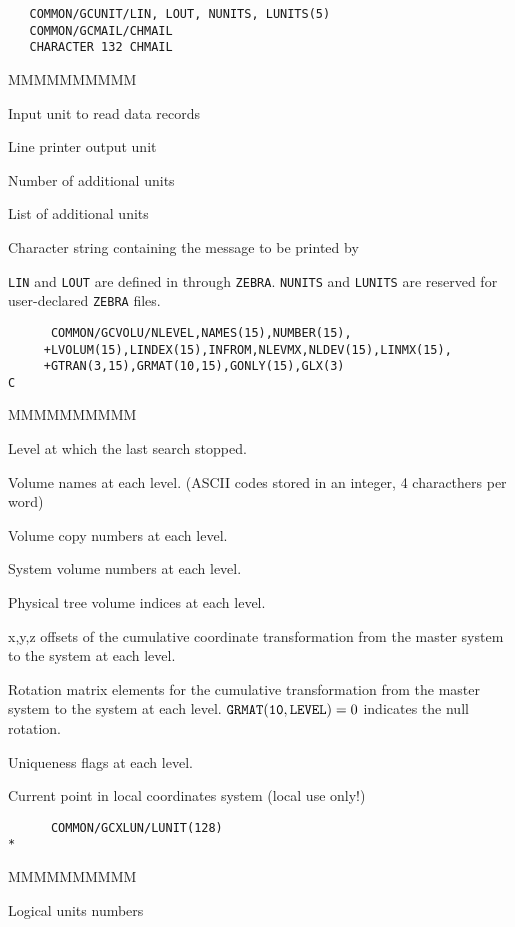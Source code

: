 \begin{verbatim}
   COMMON/GCUNIT/LIN, LOUT, NUNITS, LUNITS(5)
   COMMON/GCMAIL/CHMAIL
   CHARACTER 132 CHMAIL
\end{verbatim}
\begin{DLtt}{MMMMMMMMMM}
\item[LIN]Input unit to read data records
\item[LOUT]Line printer output unit
\item[NUNITS]Number of additional units
\item[LUNITS]List of additional units
\item[CHMAIL]Character string containing the message to be printed by
\end{DLtt}
 
{\tt LIN} and {\tt LOUT} are defined in  through {\tt ZEBRA}.
{\tt NUNITS} and {\tt LUNITS} are reserved
for user-declared {\tt ZEBRA} files.
\begin{verbatim}
      COMMON/GCVOLU/NLEVEL,NAMES(15),NUMBER(15),
     +LVOLUM(15),LINDEX(15),INFROM,NLEVMX,NLDEV(15),LINMX(15),
     +GTRAN(3,15),GRMAT(10,15),GONLY(15),GLX(3)
C
\end{verbatim}
\begin{DLtt}{MMMMMMMMMM}
\item[NLEVEL] Level at which the last search stopped.
\item[NAMES]Volume names at each level.
(ASCII codes stored in an integer, 4 characthers per word)
\item[NUMBER]Volume copy numbers at each level.
\item[LVOLUM]System volume numbers at each level.
\item[LINDEX]Physical tree volume indices at each level.
\item[INFROM]
\item[NLEVMX]
\item[NLDEV]
\item[LINMX]
\item[GTRAN]x,y,z offsets of the cumulative coordinate
transformation from the master system to the system at each level.
\item[GRMAT]Rotation matrix elements for the cumulative
transformation from the master system to the system at each level.
${\tt GRMAT(10,LEVEL)}=0$ indicates the null rotation.
\item[GONLY] Uniqueness flags at each level.
\item[GLX]Current point in local coordinates system (local use only!)
\end{DLtt}
\begin{verbatim}
      COMMON/GCXLUN/LUNIT(128)
*
\end{verbatim}
\begin{DLtt}{MMMMMMMMMM}
\item[LUNIT]Logical units numbers
\end{DLtt}

